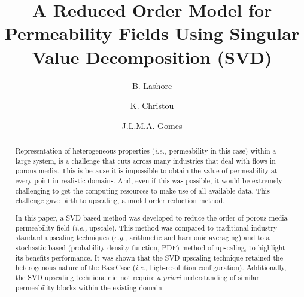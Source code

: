 \documentclass[preprint,12pt]{elsarticle}
\newcommand{\eg}{{\it e.g., }}
\newcommand{\ie}{{\it i.e., }}
\begin{document}
\begin{frontmatter}



\title{A Reduced Order Model for Permeability Fields Using Singular Value Decomposition (SVD)}
\author[UoA]{B. Lashore} \author[UoA]{K. Christou} \author[UoA]{J.L.M.A. Gomes}
\address[UoA]{Mechanics of Fluids, Soils \& Structures Research Group \\ School of Engineering, University of Aberdeen, UK}


\begin{abstract}

Representation of heterogeneous properties (\ie permeability in this case) within a large system, is a challenge that cuts across many industries that deal with flows in porous media. This is because it is impossible to obtain the value of permeability at every point in realistic domains. And, even if this was possible, it would be extremely challenging to get the computing resources to make use of all available data. This challenge gave birth to upscaling, a model order reduction method.

In this paper, a SVD-based method was developed to reduce the order of porous media permeability field (\ie upscale). This method was compared to traditional industry-standard upscaling techniques (\eg arithmetic and harmonic averaging) and to a stochastic-based (probability density function, PDF) method of upscaling, to highlight its benefits performance. It was shown that the SVD upscaling technique retained the heterogenous nature of the BaseCase (\ie high-resolution configuration). Additionally, the SVD upscaling technique did not require {\it a priori} understanding of similar permeability blocks within the existing domain.


\end{abstract}
\end{frontmatter}
\end{document}
